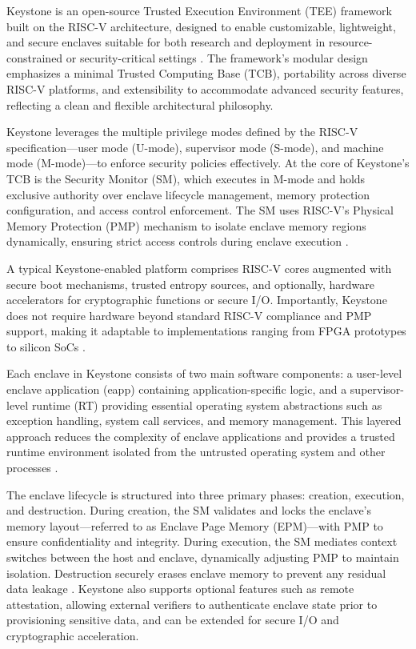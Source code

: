 Keystone is an open-source Trusted Execution Environment (TEE) framework built on the RISC-V architecture, designed to enable customizable, lightweight, and secure enclaves suitable for both research and deployment in resource-constrained or security-critical settings \cite{dayeol2019keystone}. The framework’s modular design emphasizes a minimal Trusted Computing Base (TCB), portability across diverse RISC-V platforms, and extensibility to accommodate advanced security features, reflecting a clean and flexible architectural philosophy.

Keystone leverages the multiple privilege modes defined by the RISC-V specification—user mode (U-mode), supervisor mode (S-mode), and machine mode (M-mode)—to enforce security policies effectively. At the core of Keystone’s TCB is the Security Monitor (SM), which executes in M-mode and holds exclusive authority over enclave lifecycle management, memory protection configuration, and access control enforcement. The SM uses RISC-V’s Physical Memory Protection (PMP) mechanism to isolate enclave memory regions dynamically, ensuring strict access controls during enclave execution \cite{dayeol2019keystone}.

A typical Keystone-enabled platform comprises RISC-V cores augmented with secure boot mechanisms, trusted entropy sources, and optionally, hardware accelerators for cryptographic functions or secure I/O. Importantly, Keystone does not require hardware beyond standard RISC-V compliance and PMP support, making it adaptable to implementations ranging from FPGA prototypes to silicon SoCs \cite{dayeol2019keystone}.

Each enclave in Keystone consists of two main software components: a user-level enclave application (eapp) containing application-specific logic, and a supervisor-level runtime (RT) providing essential operating system abstractions such as exception handling, system call services, and memory management. This layered approach reduces the complexity of enclave applications and provides a trusted runtime environment isolated from the untrusted operating system and other processes \cite{dayeol2019keystone}.

The enclave lifecycle is structured into three primary phases: creation, execution, and destruction. During creation, the SM validates and locks the enclave’s memory layout—referred to as Enclave Page Memory (EPM)—with PMP to ensure confidentiality and integrity. During execution, the SM mediates context switches between the host and enclave, dynamically adjusting PMP to maintain isolation. Destruction securely erases enclave memory to prevent any residual data leakage \cite{dayeol2019keystone}. Keystone also supports optional features such as remote attestation, allowing external verifiers to authenticate enclave state prior to provisioning sensitive data, and can be extended for secure I/O and cryptographic acceleration.


